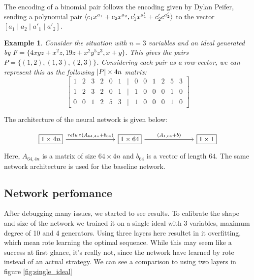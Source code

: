 \documentclass{article}
\theoremstyle{changedot}
\theoremstyle{changedotbreak}
\theoremstyle{nonumberplain}
\newtheorem{example}{Example}
\DeclarePairedDelimiter{\tuple}{\langle}{\rangle}
\DeclarePairedDelimiter{\abs}{\lvert}{\rvert}
\newcommand{\card}[1]{\abs{#1}}
\begin{document}
The encoding of a binomial pair follows the encoding given by Dylan Peifer, sending a polynomial pair $\tuple{c_{1}x^{a_{1}} + c_{2}x^{a_{2}}, c'_{1}x^{a'_{1}} + c'_{2} c^{a'_{2}}}$ to the vector $[a_{1} \mid a_{2} \mid a'_{1} \mid a'_{2}]$.

\begin{example}
  Consider the situation with $n=3$ variables and an ideal generated by $F = \{4xyz + x^{2}z, 19z + x^{2}y^{5}z^{3}, x + y\}$. This gives the pairs $P = \{(1, 2), (1, 3), (2, 3)\}$. Considering each pair as a row-vector, we can represent this as the following $\card P \times 4n$ matrix:
  \[\begin{bmatrix}
      1 & 2 & 3 & 2 & 0 & 1 &\mid & 0 & 0 & 1 & 2 & 5 & 3 \\
      1 & 2 & 3 & 2 & 0 & 1 &\mid & 1 & 0 & 0 & 0 & 1 & 0 \\
      0 & 0 & 1 & 2 & 5 & 3 &\mid & 1 & 0 & 0 & 0 & 1 & 0
    \end{bmatrix}\]
\end{example}

The architecture of the neural network is given below:

\[\begin{tikzcd}
	{\boxed{1 \times 4n}} &&& {\boxed{1 \times 64}} &&& {\boxed{1\times1}}
	\arrow["{relu \,\circ (A_{64, 4n} + b_{64})}", from=1-1, to=1-4]
	\arrow["{(A_{1, 64} + b)}", from=1-4, to=1-7]
\end{tikzcd}\]
Here, $A_{64, 4n}$ is a matrix of size $64 \times 4n$ and $b_{64}$ is a vector of length $64$. The same network architecture is used for the baseline network.

\subsection{Network perfomance}
After debugging many issues, we started to see results. To calibrate the shape and size of the network we trained it on a single ideal with 3 variables, maximum degree of 10 and 4 generators. Using three layers here resultet in it overfitting, which mean rote learning the optimal sequence. While this may seem like a success at first glance, it's really not, since the network have learned by rote instead of an actual strategy. We can see a comparison to using two layers in figure \ref{fig:single_ideal}
\end{document}
